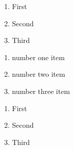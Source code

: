 \documentclass{article}
\begin{document}
\begin{enumerate}
     \item First
     \item Second
     \item Third
\end{enumerate}
\begin{enumerate}[label=\textcolor{blue}{\arabic*}]
    \item  number one item
    \item  number two item
    \item  number three item
 \end{enumerate}
\begin{enumerate}
     \item First
     \item Second
     \item Third
\end{enumerate}
 
\end{document}
